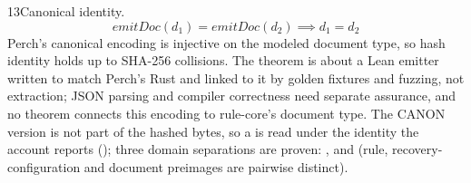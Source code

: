 \begin{perchstatement}{13}{Canonical identity.}\label{stmt:canonical-identity}
\[\mathit{emitDoc}(d_1) = \mathit{emitDoc}(d_2) \implies d_1 = d_2\]
Perch's canonical encoding is injective on the modeled document type, so hash identity holds up to SHA-256 collisions. The theorem is about a Lean emitter written to match Perch's Rust  and linked to it by golden fixtures and fuzzing, not extraction; JSON parsing and compiler correctness need separate assurance, and no theorem connects this encoding to rule-core's document type. The CANON version is not part of the hashed bytes, so a  is read under the identity the account reports (); three domain separations are proven: ,  and  (rule, recovery-configuration and document preimages are pairwise distinct).
\end{perchstatement}
